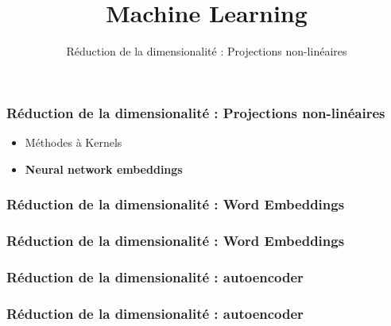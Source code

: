 \documentclass{formation}
\title{Machine Learning}
\subtitle{Réduction de la dimensionalité : Projections non-linéaires}
\begin{document}
\maketitle

\begin{frame}
  \frametitle{Réduction de la dimensionalité : Projections non-linéaires}
    \begin{itemize}
    \item Méthodes à Kernels
    \item \textbf{Neural network embeddings}
    \end{itemize}
\end{frame}

\begin{frame}
  \frametitle{Réduction de la dimensionalité : Word Embeddings}
\end{frame}

\begin{frame}
  \frametitle{Réduction de la dimensionalité : Word Embeddings}
\end{frame}

\begin{frame}
  \frametitle{Réduction de la dimensionalité : autoencoder}
\end{frame}

\begin{frame}
  \frametitle{Réduction de la dimensionalité : autoencoder}
\end{frame}
\end{document}
